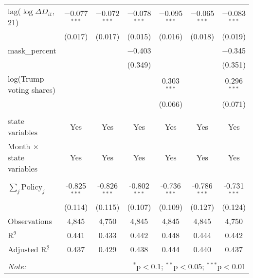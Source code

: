 \begin{tabular}{@{\extracolsep{1pt}}lcccccc}
  lag($\log \Delta D_{it}$, 21) & $-$0.077$^{***}$ & $-$0.072$^{***}$ & $-$0.078$^{***}$ & $-$0.095$^{***}$ & $-$0.065$^{***}$ & $-$0.083$^{***}$ \\ 
  & (0.017) & (0.017) & (0.015) & (0.016) & (0.018) & (0.019) \\ 
  mask\_percent &  &  & $-$0.403 &  &  & $-$0.345 \\ 
  &  &  & (0.349) &  &  & (0.351) \\ 
  log(Trump voting shares) &  &  &  & 0.303$^{***}$ &  & 0.296$^{***}$ \\ 
  &  &  &  & (0.066) &  & (0.071) \\ 
 \hline \\[-1.8ex] 
state variables & Yes & Yes & Yes & Yes & Yes & Yes \\ 
Month $\times$ state variables & Yes & Yes & Yes & Yes & Yes & Yes \\ 
\hline \\[-1.8ex] 
$\sum_j \mathrm{Policy}_j$ & -0.825$^{***}$ & -0.826$^{***}$ & -0.802$^{***}$ & -0.736$^{***}$ & -0.786$^{***}$ & -0.731$^{***}$ \\ 
 & (0.114) & (0.115) & (0.107) & (0.109) & (0.127) & (0.124) \\ 
Observations & 4,845 & 4,750 & 4,845 & 4,845 & 4,845 & 4,750 \\ 
R$^{2}$ & 0.441 & 0.433 & 0.442 & 0.448 & 0.444 & 0.442 \\ 
Adjusted R$^{2}$ & 0.437 & 0.429 & 0.438 & 0.444 & 0.440 & 0.437 \\ 
\hline 
\hline \\[-1.8ex] 
\textit{Note:}  & \multicolumn{6}{r}{$^{*}$p$<$0.1; $^{**}$p$<$0.05; $^{***}$p$<$0.01} \\ 
\end{tabular} 